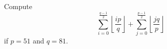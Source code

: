 Compute \[\sum_{i=0}^{\frac{q-1}{2}}\left\lfloor\frac{ip}{q}\right\rfloor+\sum_{j=0}^{\frac{p-1}{2}}\left\lfloor\frac{jq}{p}\right\rfloor\] if $p=51$ and $q=81$.